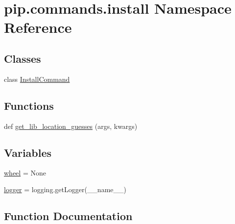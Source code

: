 \hypertarget{namespacepip_1_1commands_1_1install}{}\section{pip.\+commands.\+install Namespace Reference}
\label{namespacepip_1_1commands_1_1install}
\subsection*{Classes}
\begin{DoxyCompactItemize}
\item 
class \hyperlink{classpip_1_1commands_1_1install_1_1_install_command}{Install\+Command}
\end{DoxyCompactItemize}
\subsection*{Functions}
\begin{DoxyCompactItemize}
\item 
def \hyperlink{namespacepip_1_1commands_1_1install_a46b2d2b02f7f783372e028d9f6570669}{get\+\_\+lib\+\_\+location\+\_\+guesses} (args, kwargs)
\end{DoxyCompactItemize}
\subsection*{Variables}
\begin{DoxyCompactItemize}
\item 
\hyperlink{namespacepip_1_1commands_1_1install_a3444b754519ea80c66f8942952656251}{wheel} = None
\item 
\hyperlink{namespacepip_1_1commands_1_1install_acfcff048c8cc28d587aa495beda3638b}{logger} = logging.\+get\+Logger(\+\_\+\+\_\+name\+\_\+\+\_\+)
\end{DoxyCompactItemize}


\subsection{Function Documentation}
\mbox{\label{namespacepip_1_1commands_1_1install_a46b2d2b02f7f783372e028d9f6570669}} 
